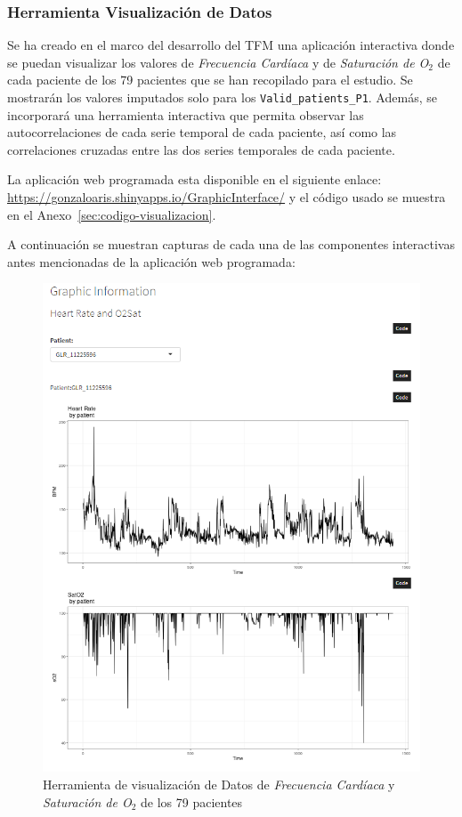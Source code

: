 \newpage
\subsubsection{Herramienta Visualización de Datos}\label{sec:visualizacion-datos}

Se ha creado en el marco del desarrollo del TFM una aplicación interactiva donde se puedan visualizar los valores de \textit{Frecuencia Cardíaca} y de \textit{Saturación de O$_2$} de cada paciente de los 79 pacientes que se han recopilado para el estudio. Se mostrarán los valores imputados solo para los \texttt{Valid\_patients\_P1}. Además, se incorporará una herramienta interactiva que permita observar las autocorrelaciones de cada serie temporal de cada paciente, así como las correlaciones cruzadas entre las dos series temporales de cada paciente.

La aplicación web programada esta disponible en el siguiente enlace: \url{https://gonzaloaris.shinyapps.io/GraphicInterface/} y el código usado se muestra en el Anexo~\ref{sec:codigo-visualizacion}.

A continuación se muestran capturas de cada una de las componentes interactivas antes mencionadas de la aplicación web programada:

\begin{figure}[H]
    \centering
    \includegraphics[scale = 1]{./img/graphic1.png}
    \caption{Herramienta de visualización de Datos de \textit{Frecuencia Cardíaca} y \textit{Saturación de O$_2$} de los 79 pacientes}\label{fig:visualizacion-datos-1}
\end{figure}

